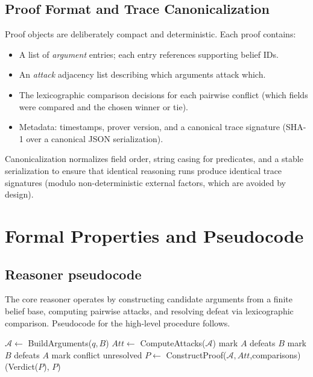 \documentclass[11pt]{article}
\begin{document}
\subsection{Proof Format and Trace Canonicalization}
Proof objects are deliberately compact and deterministic. Each proof contains:
\begin{itemize}
  \item A list of \emph{argument} entries; each entry references supporting belief IDs.
  \item An \emph{attack} adjacency list describing which arguments attack which.
  \item The lexicographic comparison decisions for each pairwise conflict (which fields
    were compared and the chosen winner or tie).
  \item Metadata: timestamps, prover version, and a canonical trace signature (SHA-1
    over a canonical JSON serialization).
\end{itemize}

Canonicalization normalizes field order, string casing for predicates, and a stable
serialization to ensure that identical reasoning runs produce identical trace
signatures (modulo non-deterministic external factors, which are avoided by design).

\section{Formal Properties and Pseudocode}
\label{sec:formal}

\subsection{Reasoner pseudocode}
The core reasoner operates by constructing candidate arguments from a finite
belief base, computing pairwise attacks, and resolving defeat via lexicographic
comparison. Pseudocode for the high-level procedure follows.

\begin{algorithm}
\caption{Reasoner: Build-and-Compare}
\begin{algorithmic}[1]
  \State $\mathcal{A} \gets$ BuildArguments($q,B$)
  \State $\mathit{Att} \gets$ ComputeAttacks($\mathcal{A}$)
      \State mark $A$ defeats $B$
      \State mark $B$ defeats $A$
    \Else
      \State mark conflict unresolved
    \EndIf
  \EndFor
  \State $P \gets$ ConstructProof($\mathcal{A},\mathit{Att}$,comparisons)
  \State \Return (Verdict($P$), $P$)
\EndProcedure
\end{algorithmic}
\end{algorithm}
\end{document}
